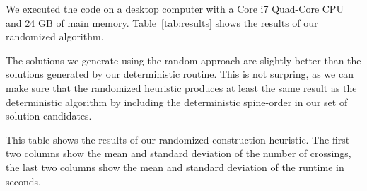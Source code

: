 \documentclass{scrartcl}
\begin{document}
We executed the code on a desktop computer with a Core i7 Quad-Core
CPU and 24 GB of main memory. Table~\ref{tab:results} shows the
results of our randomized algorithm.


The solutions we generate using the random approach are
slightly better than the solutions generated by our deterministic
routine. This is not surpring, as we can make sure that the randomized
heuristic produces at least the same result as the deterministic
algorithm by including the deterministic spine-order in our set of
solution candidates.




\begin{table}[h]

\centering

\caption{This table shows the results of our randomized construction heuristic. The first two
columns show the mean and standard deviation of the number of crossings, the last two columns
show the mean and standard deviation of the runtime in seconds.}
\label{tab:results}
\end{table}
\end{document}

